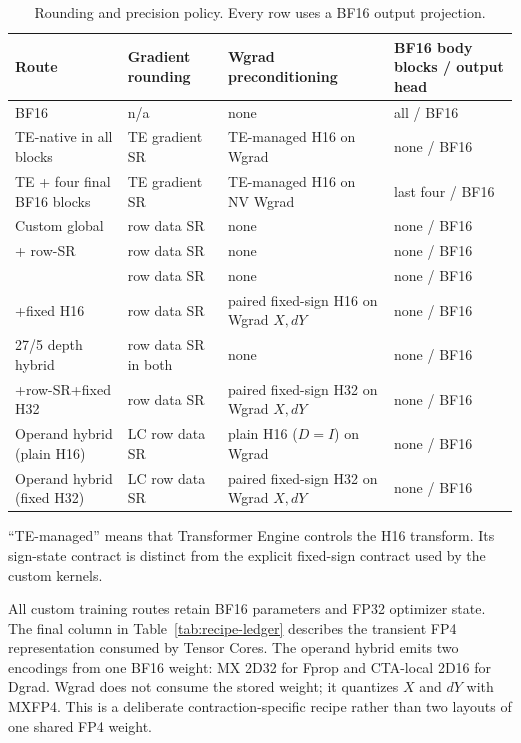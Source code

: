 \begin{table}[htbp]
  \centering
  \footnotesize
  \caption{Rounding and precision policy. Every row uses a BF16 output
  projection.}
  \label{tab:recipe-state-ledger}
  \begin{tabularx}{\textwidth}{@{}lYYY@{}}
    \toprule
    Route & Gradient rounding & Wgrad preconditioning & BF16 body blocks / output head \\
    \midrule
    BF16 & n/a & none & all / BF16 \\
    TE-native \nvfp{} in all blocks & TE gradient SR & TE-managed H16 on Wgrad & none / BF16 \\
    TE \nvfp{} + four final BF16 blocks & TE gradient SR & TE-managed H16 on NV Wgrad & last four / BF16 \\
    Custom global \nvfp{} & row data SR & none & none / BF16 \\
    \mxfp{} + row-SR & row data SR & none & none / BF16 \\
    \localcta{} & row data SR & none & none / BF16 \\
    \localcta{}+fixed H16 & row data SR & paired fixed-sign H16 on Wgrad $X,dY$ & none / BF16 \\
    27/5 depth hybrid & row data SR in both & none & none / BF16 \\
    \mxfp{}+row-SR+fixed H32 & row data SR & paired fixed-sign H32 on Wgrad $X,dY$ & none / BF16 \\
    Operand hybrid (plain H16) & LC row data SR & plain H16 ($D=I$) on Wgrad & none / BF16 \\
    Operand hybrid (fixed H32) & LC row data SR & paired fixed-sign H32 on Wgrad $X,dY$ & none / BF16 \\
    \bottomrule
  \end{tabularx}
\end{table}

``TE-managed'' means that Transformer Engine controls the H16 transform. Its
sign-state contract is distinct from the explicit fixed-sign contract used by
the custom kernels.

All custom training routes retain BF16 parameters and FP32 optimizer state. The final column
in Table~\ref{tab:recipe-ledger} describes the transient FP4 representation
consumed by Tensor Cores. The operand hybrid emits two encodings from one BF16
weight: MX 2D32 for Fprop and CTA-local 2D16 for Dgrad. Wgrad does not consume
the stored weight; it quantizes $X$ and $dY$ with MXFP4. This is a
deliberate contraction-specific recipe rather than two layouts of one shared
FP4 weight.

